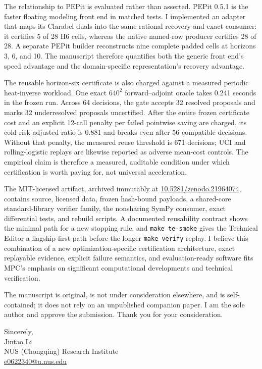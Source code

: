 \documentclass[10pt]{letter}
\begin{document}
The relationship to PEPit is evaluated rather than asserted.  PEPit 0.5.1 is
the faster floating modeling front end in matched tests.  I implemented an
adapter that maps its Clarabel duals into the same rational recovery and exact
consumer: it certifies 5 of 28 H6 cells, whereas the native named-row producer
certifies 28 of 28.  A separate PEPit builder reconstructs nine complete padded
cells at horizons 3, 6, and 10.  The manuscript therefore quantifies both the
generic front end's speed advantage and the domain-specific representation's
recovery advantage.

The reusable horizon-six certificate is also charged against a measured
periodic heat-inverse workload.  One exact $640^2$ forward--adjoint oracle takes
0.241 seconds in the frozen run.  Across 64 decisions, the gate accepts 32
resolved proposals and marks 32 underresolved proposals uncertified.  After the
entire frozen certificate cost and an explicit 12-call penalty per failed
pointwise saving are charged, its cold risk-adjusted ratio is 0.881 and breaks
even after 56 compatible decisions.  Without that penalty, the measured reuse
threshold is 671 decisions; UCI
and rolling-logistic replays are likewise reported as adverse mean-cost
controls.  The empirical claim is therefore a measured, auditable condition
under which certification is worth paying for, not universal acceleration.

The MIT-licensed artifact, archived immutably at
\href{https://doi.org/10.5281/zenodo.21964074}{10.5281/zenodo.21964074},
contains source, licensed data, frozen hash-bound
payloads, a shared-core standard-library verifier family, the nonsharing SymPy
consumer, exact differential tests, and rebuild scripts.  A documented
reusability contract shows the minimal path for a new stopping rule, and
\texttt{make te-smoke} gives the Technical Editor a
flagship-first path before the longer \texttt{make verify} replay.  I believe
this combination of a new optimization-specific certification architecture,
exact replayable evidence, explicit failure semantics, and evaluation-ready
software fits MPC's emphasis on significant computational developments and
technical verification.

The manuscript is original, is not under consideration elsewhere, and is
self-contained; it does not rely on an unpublished companion paper.  I am the
sole author and approve the submission.  Thank you for your consideration.

Sincerely,\\[0.4em]
Jintao Li\\
NUS (Chongqing) Research Institute\\
\href{mailto:e0622340@u.nus.edu}{e0622340@u.nus.edu}
\end{document}
